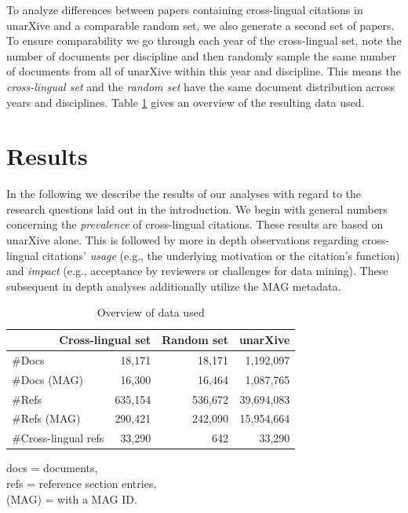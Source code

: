 To analyze differences between papers containing cross-lingual citations in unarXive and a comparable random set, we also generate a second set of papers. To ensure comparability we go through each year of the cross-lingual set, note the number of documents per discipline and then randomly sample the same number of documents from all of unarXive within this year and discipline. This means the \emph{cross-lingual set} and the \emph{random set} have the same document distribution across years and disciplines. Table \ref{tab:dataused} gives an overview of the resulting data used.

\section{Results}\label{sec:results}

In the following we describe the results of our analyses with regard to the research questions laid out in the introduction. We begin with general numbers concerning the \emph{prevalence} of cross-lingual citations. These results are based on unarXive alone. This is followed by more in depth observations regarding cross-lingual citations' \emph{usage} (e.g., the underlying motivation or the citation's function) and \emph{impact} (e.g., acceptance by reviewers or challenges for data mining). These subsequent in depth analyses additionally utilize the MAG metadata.

\begin{table}
\caption{Overview of data used}
 \label{tab:dataused}
  \centering
  \begin{small}
 \begin{threeparttable}
 \begin{tabular}{lrrr}
 \toprule
   \multicolumn{2}{r}{Cross-lingual set} & Random set & unarXive \\
   \midrule
   \#Docs & 18,171 & 18,171 & 1,192,097 \\
   \#Docs (MAG) & 16,300 & 16,464 & 1,087,765 \\
   \#Refs & 635,154 & 536,672 & 39,694,083 \\
   \#Refs (MAG) & 290,421 & 242,090 & 15,954,664 \\
   \#Cross-lingual refs & 33,290 & 642 & 33,290 \\
   \bottomrule
 \end{tabular}
 \begin{tablenotes}
    \item *docs  =  documents,\\\hphantom{*}refs  =  reference section entries,\\\hphantom{*}(MAG) = with a MAG ID.
  \end{tablenotes}
\end{threeparttable}
  \end{small}
\end{table}

